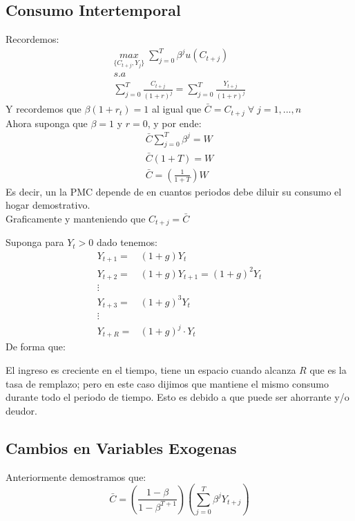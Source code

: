 \documentclass[12pt]{article}
\begin{document}
\subsection{Consumo Intertemporal}
Recordemos:
\begin{align*}
    \underset{\{C_{t+j},Y_j\}}{max}\; \sum_{j=0}^T \beta^ju(C_{t+j})\\
    s.a \\
    \sum^T_{j=0}\frac{C_{t+j}}{(1+r)^j}=\sum^T_{j=0}\frac{Y_{t+j}}{(1+r)^j}
\end{align*}
Y recordemos que $\beta(1+r_t)=1$ al igual que $\bar{C}=C_{t+j}\; \forall\; j=1,...,n$\\
Ahora suponga que $\beta=1$ y $r=0$, y por ende: 
\begin{align*}
\bar{C}\sum_{j=0}^T\beta^j=W\\
    \bar{C}(1+T)=W\\
    \bar{C}=(\frac{1}{1+T})W
\end{align*}
Es decir, un la PMC depende de en cuantos periodos debe diluir su consumo el hogar demostrativo. \\
Graficamente y manteniendo que $C_{t+j}=\bar{C}$\\
\begin{figure} [H]
        \centering
        
        \label{fig:placeholder}
\end{figure}

Suponga para $Y_t>0$ dado tenemos: 
\begin{align*}
    Y_{t+1}=&(1+g)Y_t\\ Y_{t+2}=&(1+g)Y_{t+1}=(1+g)^2Y_t\\
    \vdots \\Y_{t+3}=&(1+g)^3Y_t\\\vdots \\ Y_{t+R}=&(1+g)^j\cdot Y_t     
\end{align*}
De forma que: 
\begin{figure} [H]
        \centering
        
        \label{fig:placeholder}
\end{figure}
El ingreso es creciente en el tiempo, tiene un espacio cuando alcanza $R$ que es la tasa de remplazo; pero en este caso dijimos que mantiene el mismo consumo durante todo el periodo de tiempo. Esto es debido a que puede ser ahorrante y/o deudor. 
\newpage
\subsection{Cambios en Variables Exogenas}
Anteriormente demostramos que:
$$\bar{C}=(\frac{1-\beta}{1-\beta^{T+1}})(\sum_{j=0}^T\beta^jY_{t+j})$$
\end{document}
